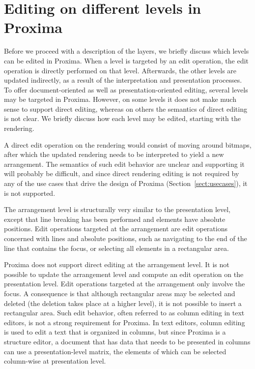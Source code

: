 %																
%																
%																
\section{Editing on different levels in Proxima}

Before we proceed with a description of the layers, we briefly discuss which levels can be edited in Proxima. When a level is targeted by an edit operation, the edit operation is directly performed on that level. Afterwards, the other levels are updated indirectly, as a result of the interpretation and presentation processes. To offer document-oriented as well as presentation-oriented editing, several levels may be targeted in Proxima. However, on some levels it does not make much sense to support direct editing, whereas on others the semantics of direct editing is not clear. We briefly discuss how each level may be edited, starting with the rendering.


A direct edit operation on the rendering would consist of moving around bitmaps, after which the updated rendering needs to be interpreted to yield a new arrangement. The semantics of such edit behavior are unclear and supporting it will probably be difficult, and since direct rendering editing is not required by any of the use cases that drive the design of Proxima (Section~\ref{sect:usecases}), it is not supported.
  
  
\bc
The arrangement level is structurally very similar to the presentation level, except that line breaking has been performed and elements have absolute positions. Edit operations targeted at the arrangement are edit operations concerned with lines and absolute positions, such as navigating to the end of the line that contains the focus, or selecting all elements in a rectangular area.
\ec


Proxima does not support direct editing at the arrangement level. It is not possible to update the arrangement level and compute an edit operation on the presentation level. Edit operations targeted at the arrangement only involve the focus. A consequence is that although rectangular areas may be selected and deleted (the deletion takes place at a higher level), it is not possible to insert a rectangular area. Such edit behavior, often referred to as column editing in text editors, is not a strong requirement for Proxima. In text editors, column editing is used to edit a text that is organized in columns, but since Proxima is a structure editor, a document that has data that needs to be presented in columns can use a presentation-level matrix, the elements of which can be selected column-wise at presentation level.


